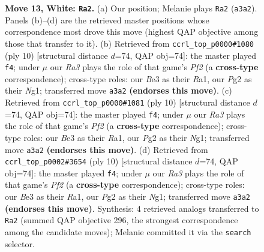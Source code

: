 \documentclass[11pt]{article}
\begin{document}
\begin{figure}[p]
\caption{\textbf{Move 13, White: \texttt{Ra2}.} (a) Our position; Melanie plays \texttt{Ra2} (\texttt{a3a2}). Panels (b)--(d) are the retrieved master positions whose correspondence most drove this move (highest QAP objective among those that transfer to it). (b) Retrieved from \texttt{ccrl\_top\_p0000\#1080} (ply 10) [structural distance $d$=74, QAP obj=74]: the master played \texttt{f4}; under $\mu$ our \emph{Ra3} plays the role of that game's \emph{Pf2} (a \textbf{cross-type} correspondence); cross-type roles: our \emph{B}e3 as their \emph{R}a1, our \emph{P}g2 as their \emph{N}g1; transferred move \texttt{a3a2} \textbf{(endorses this move)}. (c) Retrieved from \texttt{ccrl\_top\_p0000\#1081} (ply 10) [structural distance $d$=74, QAP obj=74]: the master played \texttt{f4}; under $\mu$ our \emph{Ra3} plays the role of that game's \emph{Pf2} (a \textbf{cross-type} correspondence); cross-type roles: our \emph{B}e3 as their \emph{R}a1, our \emph{P}g2 as their \emph{N}g1; transferred move \texttt{a3a2} \textbf{(endorses this move)}. (d) Retrieved from \texttt{ccrl\_top\_p0002\#3654} (ply 10) [structural distance $d$=74, QAP obj=74]: the master played \texttt{f4}; under $\mu$ our \emph{Ra3} plays the role of that game's \emph{Pf2} (a \textbf{cross-type} correspondence); cross-type roles: our \emph{B}e3 as their \emph{R}a1, our \emph{P}g2 as their \emph{N}g1; transferred move \texttt{a3a2} \textbf{(endorses this move)}. Synthesis: 4 retrieved analogs transferred to \texttt{Ra2} (summed QAP objective 296, the strongest correspondence among the candidate moves); Melanie committed it via the \texttt{search} selector.}
\label{fig:thought-m24}
\end{figure}

\clearpage
\end{document}
